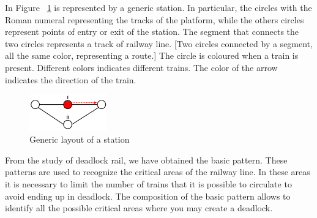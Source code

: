 \documentclass{ewic}
\begin{document}
			In Figure ~\ref{fig:rappresent} is represented by a generic station.
			In particular, the circles with the Roman numeral representing the tracks of the platform, while the others circles represent points of entry or exit of the station.
			The segment that connects the two circles represents a track of railway line.
			  [Two circles connected by a segment, all the same color, representing a route.]
			The circle is coloured when a train is present. Different colors indicates different trains. The color of the arrow indicates the direction of the train.
			
			\begin{figure}[htp]
				\begin{centering}	
				\includegraphics[width=0.3\textwidth, clip]{img/rappresentazione}
				\caption{Generic layout of a station}
				\label{fig:rappresent}
				\end{centering}
			\end{figure}
			
			
			From the study of deadlock rail, we have obtained the basic pattern.
			These patterns are used to recognize the critical areas of the railway line. In these areas it is necessary to limit the number of trains that it is possible to circulate to avoid ending up in deadlock.
			The composition of the basic pattern allows to identify all the possible critical areas where you may create a deadlock.
			
\end{document}
